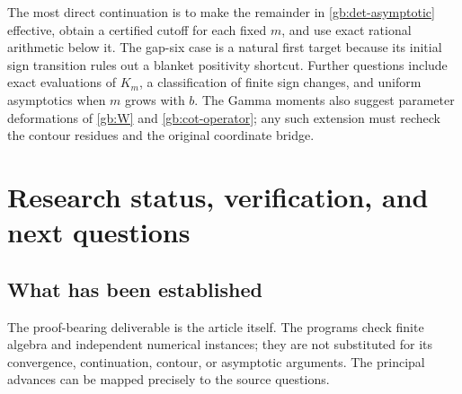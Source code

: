 \documentclass[11pt,a4paper]{article}
\numberwithin{equation}{section}
\theoremstyle{definition}
\theoremstyle{remark}
\begin{document}
The most direct continuation is to make the remainder in
\eqref{gb:det-asymptotic} effective, obtain a certified cutoff for
each fixed $m$, and use exact rational arithmetic below it.  The
gap-six case is a natural first target because its initial sign
transition rules out a blanket positivity shortcut.  Further questions
include exact evaluations of $K_m$, a classification of finite
sign changes, and uniform asymptotics when $m$ grows with $b$.
The Gamma moments also suggest parameter deformations of
\eqref{gb:W} and \eqref{gb:cot-operator}; any such extension must
recheck the contour residues and the original coordinate bridge.

\section{Research status, verification, and next questions}
\label{sec:audit}

\subsection{What has been established}

The proof-bearing deliverable is the article itself. The programs
check finite algebra and independent numerical instances; they are
not substituted for its convergence, continuation, contour, or
asymptotic arguments. The principal advances can be mapped precisely
to the source questions.
\end{document}
